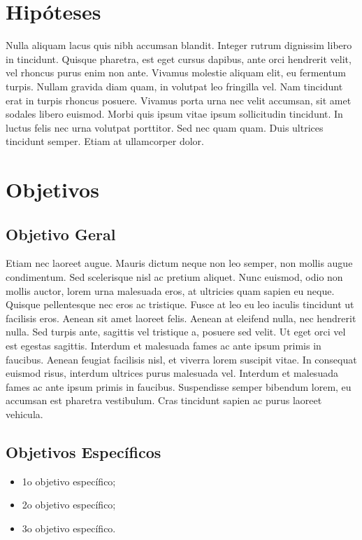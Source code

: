 \documentclass[
	12pt,				%
	a4paper,			%
    openany,
    oneside,
	english,			%
	french,				%
	spanish,			%
	brazil,				%
	]{abntex2}
\begin{document}
\section{Hipóteses}

Nulla aliquam lacus quis nibh accumsan blandit. Integer rutrum dignissim libero in tincidunt. Quisque pharetra, est eget cursus dapibus, ante orci hendrerit velit, vel rhoncus purus enim non ante. Vivamus molestie aliquam elit, eu fermentum turpis. Nullam gravida diam quam, in volutpat leo fringilla vel. Nam tincidunt erat in turpis rhoncus posuere. Vivamus porta urna nec velit accumsan, sit amet sodales libero euismod. Morbi quis ipsum vitae ipsum sollicitudin tincidunt. In luctus felis nec urna volutpat porttitor. Sed nec quam quam. Duis ultrices tincidunt semper. Etiam at ullamcorper dolor.

\section{Objetivos}

\subsection{Objetivo Geral}

Etiam nec laoreet augue. Mauris dictum neque non leo semper, non mollis augue condimentum. Sed scelerisque nisl ac pretium aliquet. Nunc euismod, odio non mollis auctor, lorem urna malesuada eros, at ultricies quam sapien eu neque. Quisque pellentesque nec eros ac tristique. Fusce at leo eu leo iaculis tincidunt ut facilisis eros. Aenean sit amet laoreet felis. Aenean at eleifend nulla, nec hendrerit nulla. Sed turpis ante, sagittis vel tristique a, posuere sed velit. Ut eget orci vel est egestas sagittis. Interdum et malesuada fames ac ante ipsum primis in faucibus. Aenean feugiat facilisis nisl, et viverra lorem suscipit vitae. In consequat euismod risus, interdum ultrices purus malesuada vel. Interdum et malesuada fames ac ante ipsum primis in faucibus. Suspendisse semper bibendum lorem, eu accumsan est pharetra vestibulum. Cras tincidunt sapien ac purus laoreet vehicula.

\subsection{Objetivos Específicos}

\begin{itemize}
	\item 1o objetivo específico;
	\item 2o objetivo específico;
	\item 3o objetivo específico.
\end{itemize}
\end{document}
